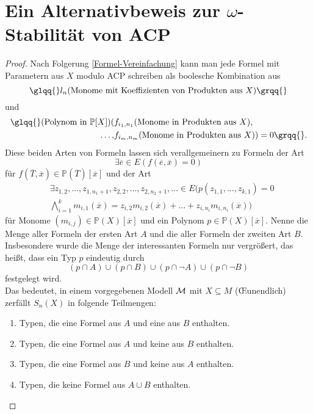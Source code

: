 \renewcommand\thesection{\Alph{section}}
\section{Ein Alternativbeweis zur $\omega$-Stabilität von ACP}

\begin{proof}
	Nach Folgerung \ref{Formel-Vereinfachung} kann man jede Formel mit Parametern aus $X$ modulo ACP schreiben als boolesche Kombination aus $$\glqq{}l_n(\text{Monome mit Koeffizienten von Produkten aus }X)\grqq{}$$ und
	\begin{align*}
	\text{\glqq{}}(\text{Polynom in }\mathbb{P}[X])(&f_{i_1,n_1}(\text{Monome in Produkten aus }X),\\\dots,&f_{i_m,n_m}(\text{Monome in Produkten aus }X))=0\grqq{}.
	\end{align*}
	Diese beiden Arten von Formeln lassen sich verallgemeinern
    zu Formeln der Art $${\exists\overline{e}\in E(f(\overline{e},\overline{x})=0)}$$ für  $f(\overline{T},\overline{x})\in\mathbb{P}(\overline{T})[\overline{x}]$ und der Art
	\begin{align*}
	&\exists z_{1,2},\dots,z_{1,n_1+1},z_{2,2},\dots,z_{2,n_2+1},\dots\in E(p(z_{1,1},\dots,z_{k,1})=0\\
	&\bigwedge\limits_{i=1}^km_{i,1}(\overline{x})=z_{i,2}m_{i,2}(\overline{x})+\dots+z_{i,n_i}m_{i,n_i}(\overline{x}))
	\end{align*}
	für Monome $(m_{i,j})\in\mathbb{P}(X)[\overline{x}]$ und ein Polynom $p\in\mathbb{P}(X)[\overline{x}]$. Nenne die Menge aller Formeln der ersten Art $A$ und die aller Formeln der zweiten Art $B$. Insbesondere wurde die Menge der \glqq{}interessanten\grqq{} Formeln nur vergrößert, das heißt, dass ein Typ $p$ eindeutig durch $$(p\cap A)\cup(p\cap B)\cup(p\cap\neg A)\cup(p\cap\neg B)$$ festgelegt wird.\\
	Das bedeutet, in einem vorgegebenen Modell $\mathcal{M}$ mit $X\subseteq M$ (\OE unendlich) zerfällt $S_n(X)$ in folgende Teilmengen:\\
	\begin{enumerate}
		\item Typen, die eine Formel aus $A$ und eine aus $B$ enthalten.
		\item Typen, die eine Formel aus $A$ und keine aus $B$ enthalten.
		\item Typen, die eine Formel aus $B$ und keine aus $A$ enthalten.
		\item Typen, die keine Formel aus $A\cup B$ enthalten.

\end{enumerate}
\end{proof}
